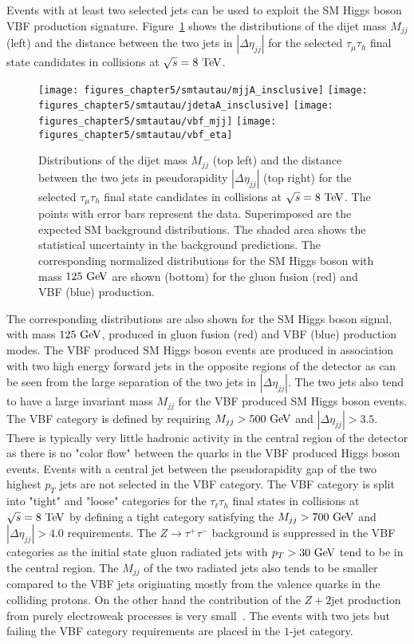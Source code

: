 Events with at least two selected jets can be used to exploit the SM Higgs boson VBF production signature. Figure~\ref{fig:vbfjet} shows the distributions of the dijet mass $M_{jj}$ (left) and the distance between the two jets in $|\Delta \eta_{jj}|$ for the selected $\tau_{\mu}\tau_{h}$ final state candidates in collisions at $\sqrt{s}=8~\mathrm{Te\kern -0.1em V}$. 
\begin{figure}[htbp]
\centering
\texttt{[image: figures\_chapter5/smtautau/mjjA\_insclusive]}
\texttt{[image: figures\_chapter5/smtautau/jdetaA\_insclusive]}
\texttt{[image: figures\_chapter5/smtautau/vbf\_mjj]}
\texttt{[image: figures\_chapter5/smtautau/vbf\_eta]}
\caption{Distributions of the dijet mass $M_{jj}$ (top left) and the distance between the two jets in pseudorapidity $|\Delta \eta_{jj}|$ (top right) for the selected $\tau_{\mu}\tau_{h}$ final state candidates in collisions at $\sqrt{s}=8~\mathrm{Te\kern -0.1em V}$. The points with error bars represent the data. Superimposed are the expected SM background distributions. The shaded area shows the statistical uncertainty in the background predictions. The corresponding normalized distributions for the SM Higgs boson with mass $125~\mathrm{Ge\kern -0.1em V}$ are shown (bottom) for the gluon fusion (red) and VBF (blue) production.}
\label{fig:vbfjet}
\end{figure}
The corresponding distributions are also shown for the SM Higgs boson signal, with mass $125~\mathrm{Ge\kern -0.1em V}$, produced in gluon fusion (red) and VBF (blue) production modes. The VBF produced SM Higgs boson events are produced in association with two high energy forward jets in the opposite regions of the detector as can be seen from the large separation of the two jets in $|\Delta \eta_{jj}|$. The two jets also tend to have a large invariant mass $M_{jj}$ for the VBF produced SM Higgs boson events.  The VBF category is defined by requiring $M_{jj}>500~\mathrm{Ge\kern -0.1em V}$ and  $|\Delta \eta_{jj}|>3.5$. There is typically very little hadronic activity in the central region of the detector as there is no "color flow" between the quarks in the VBF produced Higgs boson events. Events with a central jet between the pseudorapidity gap of the two highest $p_{T}$ jets are not selected in the VBF category. The VBF category is split into "tight" and "loose" categories for the $\tau_{\ell}\tau_{h}$ final states in collisions at $\sqrt{s}=8~\mathrm{Te\kern -0.1em V}$ by defining a tight category satisfying the $M_{jj}>700~\mathrm{Ge\kern -0.1em V}$ and $|\Delta \eta_{jj}|>4.0$ requirements. The $Z\rightarrow\tau^{+}\tau^{-}$ background is suppressed in the VBF categories as the initial state gluon radiated jets with $p_{T}>30~\mathrm{Ge\kern -0.1em V}$ tend to be in the central region. The $M_{jj}$ of the two radiated jets also tends to be smaller compared to the VBF jets originating mostly from the valence quarks in the colliding protons. On the other hand the contribution of the $Z+2$jet production from purely electroweak processes is very small~\cite{Khachatryan:2014dea}. The events with two jets but failing the VBF category requirements are placed in the $1$-jet category. 

